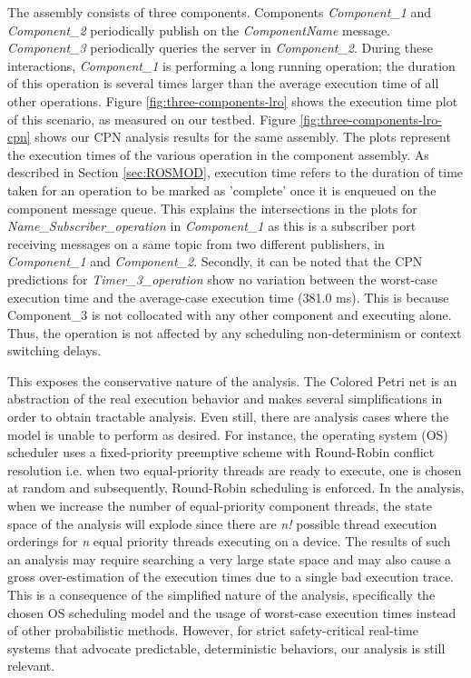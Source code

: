 The assembly consists of three components. Components \emph{Component\_1} and \emph{Component\_2} periodically publish on the \emph{ComponentName} message. \emph{Component\_3} periodically queries the server in \emph{Component\_2}. During these interactions, \emph{Component\_1} is performing a long running operation; the duration  of this operation is several times larger than the average execution time of all other operations. Figure \ref{fig:three-components-lro} shows the execution time plot of this scenario, as measured on our testbed. Figure \ref{fig:three-components-lro-cpn} shows our CPN analysis results for the same assembly. The plots represent the execution times of the various operation in the component assembly. As described in Section \ref{sec:ROSMOD}, execution time refers to the duration of time taken for an operation to be marked as 'complete' once it is enqueued on the component message queue. This explains the intersections in the plots for \emph{Name\_Subscriber\_operation} in \emph{Component\_1} as this is a subscriber port receiving messages on a same topic from two different publishers, in \emph{Component\_1} and \emph{Component\_2}. Secondly, it can be noted that the CPN predictions for \emph{Timer\_3\_operation} show no variation between the worst-case execution time and the average-case execution time (381.0 ms). This is because Component\_3 is not collocated with any other component and executing alone. Thus, the operation is not affected by any scheduling non-determinism or context switching delays. 
 
This exposes the conservative nature of the analysis. The Colored Petri net is an abstraction of the real execution behavior and makes several simplifications in order to obtain tractable analysis. Even still, there are analysis cases where the model is unable to perform as desired. For instance, the operating system (OS) scheduler uses a fixed-priority preemptive scheme with Round-Robin conflict resolution i.e. when two equal-priority threads are ready to execute, one is chosen at random and subsequently, Round-Robin scheduling is enforced. In the analysis, when we increase the number of equal-priority component threads, the state space of the analysis will explode since there are \emph{n!} possible thread execution orderings for \emph{n} equal priority threads executing on a device. The results of such an analysis may require searching a very large state space and may also cause a gross over-estimation of the execution times due to a single bad execution trace. This is a consequence of the simplified nature of the analysis, specifically the chosen OS scheduling model and the usage of worst-case execution times instead of other probabilistic methods. However, for strict safety-critical real-time systems that advocate predictable, deterministic behaviors, our analysis is still relevant. 
 
 \vspace{-0.1in}


